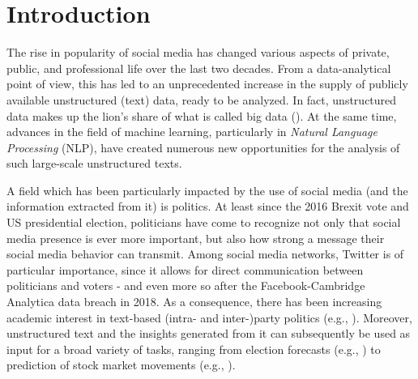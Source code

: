 \section{Introduction}
\label{Introduction}

The rise in popularity of social media has changed various aspects of private, public, and professional life over the last two decades. From a data-analytical point of view, this has led to an unprecedented increase in the supply of publicly available unstructured (text) data, ready to be analyzed. In fact, unstructured data makes up the lion's share of what is called big data (\citealp{gandomi2015beyond}). At the same time, advances in the field of machine learning, particularly in \textit{Natural Language Processing} (NLP), have created numerous new opportunities for the analysis of such large-scale unstructured texts.

A field which has been particularly impacted by the use of social media (and the information extracted from it) is politics. At least since the 2016 Brexit vote and US presidential election, politicians have come to recognize not only that social media presence is ever more important, but also how strong a message their social media behavior can transmit. Among social media networks, Twitter is of particular importance, since it allows for direct communication between politicians and voters - and even more so after the Facebook-Cambridge Analytica data breach in 2018. As a consequence, there has been increasing academic interest in text-based (intra- and inter-)party politics (e.g., \citealp{ceron2017intra, daniel2019static, grimmer2010bayesian, quinlan2018show}). Moreover, unstructured text and the insights generated from it can subsequently be used as input for a broad variety of tasks, ranging from election forecasts (e.g., \citealp{burnap2016140, jungherr2016twitter, tumasjan2010predicting}) to prediction of stock market movements (e.g., \citealp{nisar2018twitter}).

